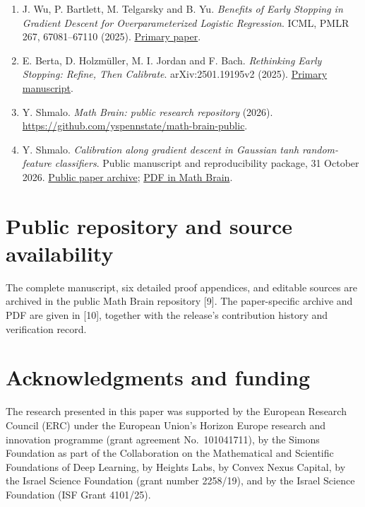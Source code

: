 \documentclass[
  11pt,
  a4paper,
]{article}
\begin{document}
\begin{enumerate}
{  paper}.
\item
  J. Wu, P. Bartlett, M. Telgarsky and B. Yu. \emph{Benefits of Early
  Stopping in Gradient Descent for Overparameterized Logistic
  Regression}. ICML, PMLR 267, 67081--67110 (2025).
  \href{https://proceedings.mlr.press/v267/wu25b.html}{Primary paper}.
\item
  E. Berta, D. Holzmüller, M. I. Jordan and F. Bach. \emph{Rethinking
  Early Stopping: Refine, Then Calibrate}. arXiv:2501.19195v2 (2025).
  \href{https://arxiv.org/html/2501.19195v2}{Primary manuscript}.
\item
  Y. Shmalo. \emph{Math Brain: public research repository} (2026).
  \url{https://github.com/yspennstate/math-brain-public}.
\item
  Y. Shmalo. \emph{Calibration along gradient descent in Gaussian tanh
  random-feature classifiers}. Public manuscript and reproducibility
  package, 31 October 2026.
  \href{https://github.com/yspennstate/math-brain-public/tree/main/papers/three-targets-2026-10-31/T357}{Public paper archive};
  \href{https://github.com/yspennstate/math-brain-public/blob/main/papers/three-targets-2026-10-31/T357/T357_Calibration_Along_Gradient_Descent.pdf}{PDF in Math Brain}.
\end{enumerate}

\section*{Public repository and source availability}
The complete manuscript, six detailed proof appendices, and editable
sources are archived in the public Math Brain repository [9]. The
paper-specific archive and PDF are given in [10], together with the
release's contribution history and verification record.

\section*{Acknowledgments and funding}\label{acknowledgments-funding-and-declarations}

The research presented in this
paper was supported by the European Research Council (ERC) under the
European Union's Horizon Europe research and innovation programme (grant
agreement No.~101041711), by the Simons Foundation as part of the
Collaboration on the Mathematical and Scientific Foundations of Deep
Learning, by Heights Labs, by Convex Nexus Capital, by the Israel
Science Foundation (grant number 2258/19), and by the Israel Science
Foundation (ISF Grant 4101/25).
\end{document}
